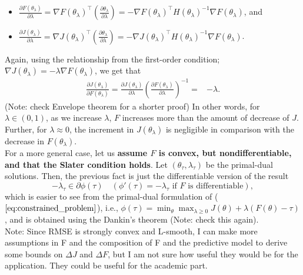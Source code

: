 \documentclass{article}
\begin{document}
\begin{itemize}
    \item $\frac{\partial F(\theta_{\lambda})}{\partial \lambda} = \nabla F(\theta_{\lambda})^{\top}\left(\frac{\partial\theta_{\lambda}}{\partial \lambda} \right )=-\nabla F(\theta_{\lambda})^{\top}H(\theta_{\lambda})^{-1} \nabla F(\theta_{\lambda})$, and
    \item $\frac{\partial J(\theta_{\lambda})}{\partial \lambda} = \nabla J(\theta_{\lambda})^{\top}\left(\frac{\partial\theta_{\lambda}}{\partial \lambda}\right)=- \nabla J(\theta_{\lambda})^{\top}H(\theta_\lambda)^{-1} \nabla F(\theta_{\lambda})$.
\end{itemize}
    Again, using the relationship from the first-order condition; $\nabla J(\theta_\lambda)=-\lambda\nabla F(\theta_\lambda)$, we get that
    \begin{align*}
     \frac{\partial J(\theta_{\lambda})}{\partial F(\theta_\lambda)}   = \frac{\partial J(\theta_{\lambda})}{\partial \lambda}  \left(\frac{\partial F(\theta_{\lambda})}{\partial \lambda}\right)^{-1}  =&- \lambda.
    \end{align*}
{\color{red} (Note: check Envelope theorem for a shorter proof)} In other words, for $\lambda \in (0,1)$, as we increase $\lambda$, $F$ increases more than the amount of decrease of $J$. Further, for $\lambda \approx 0$, the increment in $J(\theta_\lambda)$ is negligible in comparison with the decrease in $F(\theta_\lambda)$.\\

For a more general case, let us \textbf{assume $F$ is convex, but nondifferentiable, and that the Slater condition holds}. Let $(\theta_\tau, \lambda_\tau)$ be the primal-dual solutions. Then, the previous fact is just the differentiable version of the result
\begin{equation*}
 -\lambda_\tau \in \partial \phi(\tau) \quad (\phi'(\tau) = -\lambda_\tau \text{ if $F$ is differentiable}),    
\end{equation*}
which is easier to see from the primal-dual formulation of ($\ref{eq:constrained_problem}$), i.e.,
$\phi(\tau)=\min_{\theta}\max_{\lambda \geq 0} J(\theta) + \lambda (F(\theta) - \tau)$, and is obtained using the Dankin's theorem {\color{red} (Note: check this again)}. \\

{\color{red} Note: Since RMSE is strongly convex and L-smooth, I can make more assumptions in F and the composition of F and the predictive model to derive some bounds on $\Delta J$ and $\Delta F$, but I am not sure how useful they would be for the application. They could be useful for the academic part.} 
\end{document}
